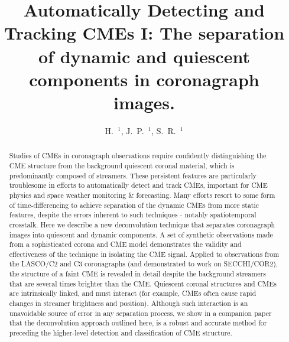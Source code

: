 \documentclass[namedreferences]{SolarPhysics}
\begin{document}
\begin{article}

\begin{opening}

\title{Automatically Detecting and Tracking CMEs I: The separation of dynamic and quiescent components in coronagraph images.}

%
\author{H.~$^{1}$\sep
		J.~P.~$^{1}$\sep
        S.~R.~$^{1}$      
       }

%


%


\begin{abstract}
Studies of CMEs in coronagraph observations require confidently distinguishing the CME structure from the background quiescent coronal material, which is predominantly composed of streamers. These persistent features are particularly troublesome in efforts to automatically detect and track CMEs, important for CME physics and space weather monitoring \& forecasting. Many efforts resort to some form of time-differencing to achieve separation of the dynamic CMEs from more static features, despite the errors inherent to such techniques - notably spatiotemporal crosstalk. Here we describe a new deconvolution technique that separates coronagraph images into quiescent and dynamic components. A set of synthetic observations made from a sophisticated corona and CME model demonstrates the validity and effectiveness of the technique in isolating the CME signal. Applied to observations from the LASCO/C2 and C3 coronagraphs (and demonstrated to work on SECCHI/COR2), the structure of a faint CME is revealed in detail despite the background streamers that are several times brighter than the CME. Quiescent coronal structures and CMEs are intrinsically linked, and must interact (for example, CMEs often cause rapid changes in streamer brightness and position). Although such interaction is an unavoidable source of error in any separation process, we show in a companion paper that the deconvolution approach outlined here, is a robust and accurate method for preceding the higher-level detection and classification of CME structure.
\end{abstract}




\end{opening}
\end{article}
\end{document}
